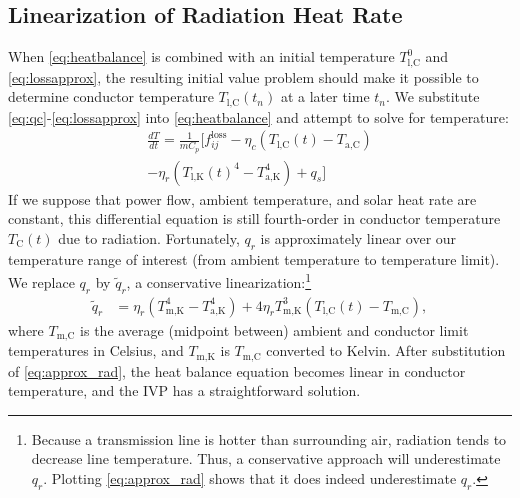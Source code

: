 \documentclass[journal,twoside]{IEEEtran}
\begin{document}
\subsection{Linearization of Radiation Heat Rate}
When \eqref{eq:heatbalance} is combined with an initial temperature $T_\text{l,C}^0$ and \eqref{eq:lossapprox}, the resulting initial value problem should make it possible to determine conductor temperature $T_\text{l,C}(t_n)$ at a later time $t_n$. We substitute \eqref{eq:qc}-\eqref{eq:lossapprox} into \eqref{eq:heatbalance} and attempt to solve for temperature:
\begin{multline}\label{eq:heatbalance_approx}
\frac{dT}{dt} = \frac{1}{mC_p}\big[ f_{ij}^\text{loss} - \eta_c\left( T_\text{l,C}(t) - T_\text{a,C}\right) \\ - \eta_r\left(T_\text{l,K}(t)^4 - T_\text{a,K}^4\right) + q_s \big]
\end{multline}
If we suppose that power flow, ambient temperature, and solar heat rate are constant, this differential equation is still fourth-order in conductor temperature $T_\text{C}(t)$ due to radiation. Fortunately, $q_r$ is approximately linear over our temperature range of interest (from ambient temperature to temperature limit). We replace $q_r$ by $\tilde{q}_r$, a conservative linearization:\footnote{Because a transmission line is hotter than surrounding air, radiation tends to decrease line temperature. Thus, a conservative approach will underestimate $q_r$. Plotting \eqref{eq:approx_rad} shows that it does indeed underestimate $q_r$.}
\begin{align}\label{eq:approx_rad}
\tilde{q}_r &= \eta_r  \left( T_\text{m,K}^4 - T_\text{a,K}^4\right) +  4\eta_rT_\text{m,K}^3(T_\text{l,C}(t) - T_\text{m,C}),
\end{align}
where $T_\text{m,C}$ is the average (midpoint between) ambient and conductor limit temperatures in Celsius, and $T_\text{m,K}$ is $T_\text{m,C}$ converted to Kelvin. After substitution of \eqref{eq:approx_rad}, the heat balance equation becomes linear in conductor temperature, and the IVP has a straightforward solution.
\end{document}
